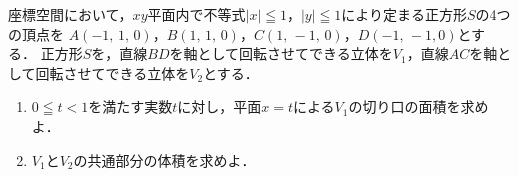 \documentclass[../../main.tex]{subfiles}
\begin{document}
座標空間において，$xy$平面内で不等式$|x|\leqq1$，$|y|\leqq1$により定まる正方形$S$の4つの頂点を
$A(-1, \, 1, \, 0)$，$B(1, \, 1, \, 0)$，$C(1, \, -1, \, 0)$，$D(-1, \, -1, 0)$とする．
正方形$S$を，直線$BD$を軸として回転させてできる立体を$V_1$，直線$AC$を軸として回転させてできる立体を$V_2$とする．
\begin{enumerate}
  \item $0 \leqq t<1$を満たす実数$t$に対し，平面$x=t$による$V_1$の切り口の面積を求めよ．
  \item $V_1$と$V_2$の共通部分の体積を求めよ．
\end{enumerate}
\end{document}
